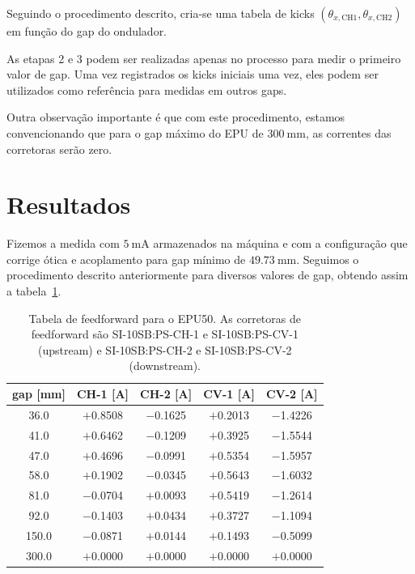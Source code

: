 \documentclass[a4paper,
               keeplastbox,   %
               ]{jacow}
\begin{document}
Seguindo o procedimento descrito, cria-se uma tabela de kicks $\left(\theta_{x, \mathrm{CH1}},\theta_{x, \mathrm{CH2}}\right)$ em função do gap do ondulador.

As etapas 2 e 3 podem ser realizadas apenas no processo para medir o primeiro valor de gap. Uma vez registrados os kicks iniciais uma vez, eles podem ser utilizados como referência para medidas em outros gaps. 

Outra observação importante é que com este procedimento, estamos convencionando que para o gap máximo do EPU de $\SI{300}{\milli\meter}$, as correntes das corretoras serão zero.

\section{Resultados}
Fizemos a medida com $\SI{5}{\milli\ampere}$ armazenados na máquina e com a configuração que corrige ótica e acoplamento para gap mínimo de $\SI{49.73}{\milli\meter}$. Seguimos o procedimento descrito anteriormente para diversos valores de gap, obtendo assim a tabela~\ref{tab:ffwd_table}.

\begin{table}
\caption{Tabela de feedforward para o EPU50. As corretoras de feedforward são SI-10SB:PS-CH-1 e SI-10SB:PS-CV-1 (upstream) e SI-10SB:PS-CH-2 e SI-10SB:PS-CV-2 (downstream).}
\centering
\begin{tabular}{ccccc}
\hline
\hline
gap {[}mm{]} & CH-1 {[}A{]} & CH-2 {[}A{]} & CV-1 {[}A{]} & CV-2 {[}A{]} \\
\hline\hline
36.0  & $+$0.8508   & $-$0.1625   & $+$0.2013   & $-$1.4226 \\ \hline
41.0  & $+$0.6462   & $-$0.1209   & $+$0.3925   & $-$1.5544 \\ \hline
47.0  & $+$0.4696   & $-$0.0991   & $+$0.5354   & $-$1.5957 \\ \hline
58.0  & $+$0.1902   & $-$0.0345   & $+$0.5643   & $-$1.6032 \\ \hline
81.0  & $-$0.0704   & $+$0.0093   & $+$0.5419   & $-$1.2614 \\ \hline
92.0  & $-$0.1403   & $+$0.0434   & $+$0.3727   & $-$1.1094 \\ \hline
150.0 & $-$0.0871   & $+$0.0144   & $+$0.1493   & $-$0.5099 \\ \hline
300.0 & $+$0.0000   & $+$0.0000   & $+$0.0000   & $+$0.0000 \\
\hline
\hline
\end{tabular}
\label{tab:ffwd_table}
\end{table}
\end{document}

